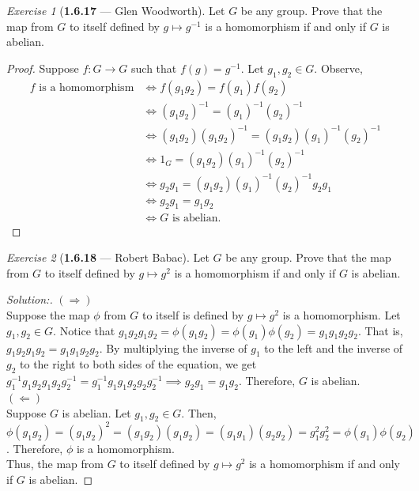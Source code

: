 \documentclass[12pt]{amsart}
\theoremstyle{remark}
\newtheorem*{exercise}{Exercise}%
\theoremstyle{mycomment}
\begin{document}
\begin{exercise}[\textbf{1.6.17} --- Glen Woodworth] Let $G$ be any group. Prove that the map from $G$ to itself defined by $g\mapsto g^{-1}$ is a homomorphism if and only if $G$ is abelian.
    \begin{proof} Suppose $f:G\rightarrow G$ such that $f(g)=g^{-1}$. Let $g_1,g_2\in G$. Observe,
    \begin{align*}
    f\text{ is a homomorphism}&\iff f(g_1g_2)=f(g_1)f(g_2)\\
    &\iff (g_1g_2)^{-1}=(g_1)^{-1}(g_2)^{-1}\\
    &\iff (g_1g_2)(g_1g_2)^{-1}=(g_1g_2)(g_1)^{-1}(g_2)^{-1}\\
    &\iff 1_G=(g_1g_2)(g_1)^{-1}(g_2)^{-1}\\
    &\iff g_2g_1=(g_1g_2)(g_1)^{-1}(g_2)^{-1}g_2g_1\\
    &\iff g_2g_1=g_1g_2\\
    &\iff G\text{ is abelian.}
    \end{align*}
    \end{proof} 
\end{exercise}
\vspace{.15in}



\begin{exercise}[\textbf{1.6.18} --- Robert Babac]  
  Let $G$ be any group. Prove that the map from $G$ to itself defined by $g\mapsto g^2$ is a homomorphism if and only if $G$ is abelian.
  \begin{proof}[Solution:]
  $(\Rightarrow)$\\
  Suppose the map $\phi$ from $G$ to itself is defined by $g\mapsto g^{2}$ is a homomorphism. Let $g_1,g_2\in G$. Notice that $g_1g_2g_1g_2=\phi(g_1g_2)=\phi(g_1)\phi(g_2)=g_1g_1g_2g_2$. That is, $g_1g_2g_1g_2=g_1g_1g_2g_2$. By multiplying the inverse of $g_1$ to the left and the inverse of $g_2$ to the right to both sides of the equation, we get $g_1^{-1}g_1g_2g_1g_2g_2^{-1}=g_1^{-1}g_1g_1g_2g_2g_2^{-1}\implies g_2g_1=g_1g_2$. Therefore, $G$ is abelian.\\
  $(\Leftarrow)$\\
  Suppose $G$ is abelian. Let $g_1,g_2\in G$. Then, $\phi(g_1g_2)=(g_1g_2)^{2}=(g_1g_2)(g_1g_2)=(g_1g_1)(g_2g_2)=g_1^{2}g_2^{2}=\phi(g_1)\phi(g_2)$. Therefore, $\phi$ is a homomorphism.\\
  Thus, the map from $G$ to itself defined by $g\mapsto g^{2}$ is a homomorphism if and only if $G$ is abelian.
  \end{proof}
  \end{exercise}
\vspace{.15in}
\end{document}
